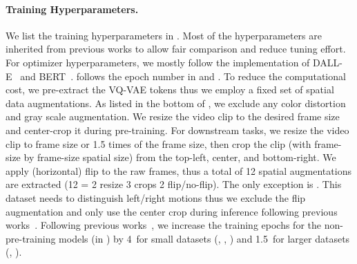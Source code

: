 \paragraph{Training Hyperparameters.} 
We list the training hyperparameters in . 
Most of the hyperparameters are inherited from previous works to allow fair comparison and reduce tuning effort. 
For optimizer hyperparameters, we mostly follow the implementation of DALL-E~\cite{ramesh2021zero} and BERT~\cite{devlin2019bert}. 
\ssv follows the epoch number in \cite{feichtenhofer2019slowfast} and \cite{feichtenhofer2021large}.
To reduce the computational cost, we pre-extract the VQ-VAE tokens thus we employ a fixed set of spatial data augmentations.
As listed in the bottom of , we exclude any color distortion and gray scale augmentation.
We resize the video clip to the desired frame size and center-crop it during pre-training.
For downstream tasks, we resize the video clip to frame size or 1.5 times of the frame size, then crop the clip (with frame-size by frame-size spatial size) from the top-left, center, and bottom-right. 
We apply (horizontal) flip to the raw frames, thus a total of 12 spatial augmentations are extracted (12 = 2 resize  3 crops  2 flip/no-flip).
The only exception is \ssv.
This dataset needs to distinguish left/right motions thus we exclude the flip augmentation and only use the center crop during inference following previous works~\cite{feichtenhofer2019slowfast, feichtenhofer2021large}.
Following previous works~\cite{feichtenhofer2019slowfast}, we increase the training epochs for the non-pre-training models (in ) by 4\x~for small datasets (\diving, \ucf, \hmdb) and 1.5\x~for larger datasets (\ssv, \ksmall).



\begin{table}
\centering
\caption{\textbf{Key statistics of video datasets} used in this paper. \htm is used for pre-training while others are downstream datasets. The number of training/validation examples in \hmdb and \ucf are reported for the train-val split 1.}
\label{tab:appen_dataset}
\end{table}

